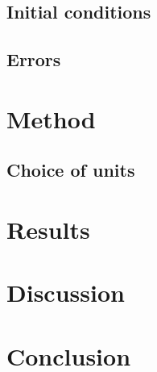 \documentclass[aps,reprint]{revtex4-1}
\newcommand\blankpage{%
  \null
  \thispagestyle{empty}%
  \addtocounter{page}{-1}%
  \newpage}
\begin{document}
\subsection{Initial conditions}

\subsection{Errors}
\section{Method}
\label{sec:method}
\subsection{Choice of units}
\section{Results}
\label{sec:results}

\section{Discussion}
\label{sec:discussion}

\section{Conclusion}
\label{sec:conclusion}


\blankpage
\appendix
\end{document}
